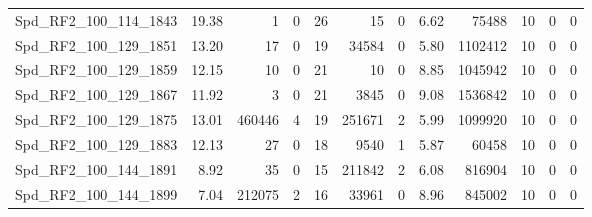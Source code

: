 \begin{longtable}[c]{@{}lrrrrrrrrrrr@{}}
Spd\_RF2\_100\_114\_1843      & 19.38                  & 1                       & 0                       & 26                     & 15                      & 0                       & 6.62                    & 75488                    & 10                       & 0                        & 0                        \\
Spd\_RF2\_100\_129\_1851      & 13.20                  & 17                      & 0                       & 19                     & 34584                   & 0                       & 5.80                    & 1102412                  & 10                       & 0                        & 0                        \\
Spd\_RF2\_100\_129\_1859      & 12.15                  & 10                      & 0                       & 21                     & 10                      & 0                       & 8.85                    & 1045942                  & 10                       & 0                        & 0                        \\
Spd\_RF2\_100\_129\_1867      & 11.92                  & 3                       & 0                       & 21                     & 3845                    & 0                       & 9.08                    & 1536842                  & 10                       & 0                        & 0                        \\
Spd\_RF2\_100\_129\_1875      & 13.01                  & 460446                  & 4                       & 19                     & 251671                  & 2                       & 5.99                    & 1099920                  & 10                       & 0                        & 0                        \\
Spd\_RF2\_100\_129\_1883      & 12.13                  & 27                      & 0                       & 18                     & 9540                    & 1                       & 5.87                    & 60458                    & 10                       & 0                        & 0                        \\
Spd\_RF2\_100\_144\_1891      & 8.92                   & 35                      & 0                       & 15                     & 211842                  & 2                       & 6.08                    & 816904                   & 10                       & 0                        & 0                        \\
Spd\_RF2\_100\_144\_1899      & 7.04                   & 212075                  & 2                       & 16                     & 33961                   & 0                       & 8.96                    & 845002                   & 10                       & 0                        & 0                        \\

\end{longtable}
